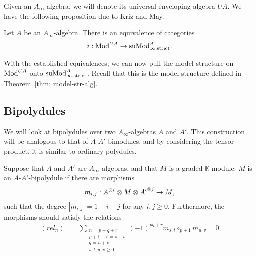 \documentclass[../thesis.tex]{subfiles}
\begin{document}
            Given an $A_\infty$-algebra, we will denote its universal enveloping algebra $UA$. We have the following proposition due to Kriz and May.

            \begin{proposition}
                Let $A$ be an $A_\infty$-algebra. There is an equivalence of categories
                \begin{align*}
                    i : \tt{Mod}^{UA} \rightarrow \tt{suMod}_{\infty,\tt{strict}}^A\tt{.}
                \end{align*}
            \end{proposition}

            With the established equivalences, we can now pull the model structure on $\tt{Mod}^{UA}$ onto $\tt{suMod}_{\infty,\tt{strict}}^A$. Recall that this is the model structure defined in Theorem~\ref{thm: model-str-alg}.

        \subsection{Bipolydules}

            We will look at bipolydules over two $A_\infty$-algebras $A$ and $A'$. This construction will be analogous to that of $A$-$A'$-bimodules, and by considering the tensor product, it is similar to ordinary polydules.

            \begin{definition}[$A$-$A'$-Bipolydule]
                Suppose that $A$ and $A'$ are $A_\infty$-algebras, and that $M$ is a graded $\mathbb{K}$-module. $M$ is an $A$-$A'$-bipolydule if there are morphisms
                \begin{align*}
                    m_{i,j} : A^{\otimes i} \otimes M \otimes {A'}^{\otimes j} \rightarrow M\tt{,}
                \end{align*}
                such that the degree $|m_{i,j}| = 1 - i - j$ for any $i,j \geq 0$. Furthermore, the morphisms should satisfy the relations
                \begin{align*}
                    (rel_n)\qquad \sum_{\substack{n = p + q + r \\ p + 1 + r = s + t \\ q = u + v \\ s,t,u,v \geq 0}}(-1)^{pq + r}m_{s,t}\circ_{p+1}m_{u,v} = 0
                \end{align*}
            \end{definition}
\end{document}

